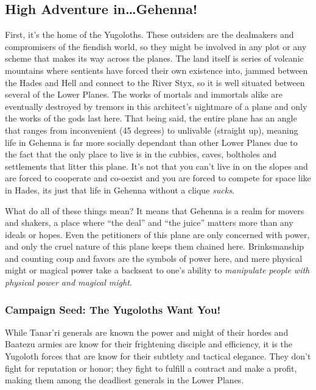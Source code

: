 \subsection{High Adventure in\ldots Gehenna!}

First, it's the home of the Yugoloths. These outsiders are the dealmakers and compromisers of the fiendish world, so they might be involved in any plot or any scheme that makes its way across the planes. The land itself is series of volcanic mountains where sentients have forced their own existence into, jammed between the Hades and Hell and connect to the River Styx, so it is well situated between several of the Lower Planes. The works of mortals and immortals alike are eventually destroyed by tremors in this architect's nightmare of a plane and only the works of the gods last here. That being said, the entire plane has an angle that ranges from inconvenient (45 degrees) to unlivable (straight up), meaning life in Gehenna is far more socially dependant than other Lower Planes due to the fact that the only place to live is in the cubbies, caves, boltholes and settlements that litter this plane. It's not that you can't live in on the slopes and are forced to cooperate and co-oexist and you are forced to compete for space like in Hades, its just that life in Gehenna without a clique \textit{sucks}.

What do all of these things mean? It means that Gehenna is a realm for movers and shakers, a place where ``the deal'' and ``the juice'' matters more than any ideals or hopes. Even the petitioners of this plane are only concerned with power, and only the cruel nature of this plane keeps them chained here. Brinksmanship and counting coup and favors are the symbols of power here, and mere physical might or magical power take a backseat to one's ability to \textit{manipulate people with physical power and magical might}.

\subsubsection{Campaign Seed: The Yugoloths Want You!}

While Tanar'ri generals are known the power and might of their hordes and Baatezu armies are know for their frightening disciple and efficiency, it is the Yugoloth forces that are know for their subtlety and tactical elegance. They don't fight for reputation or honor; they fight to fulfill a contract and make a profit, making them among the deadliest generals in the Lower Planes.

